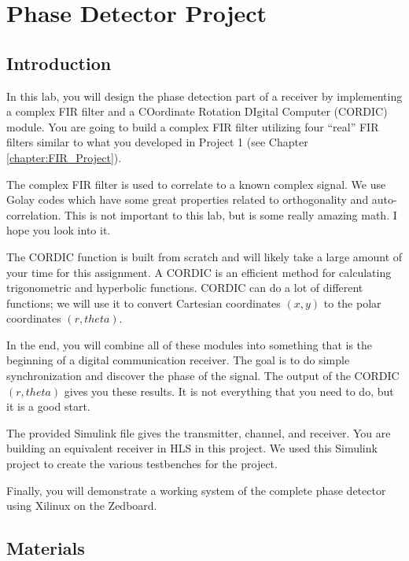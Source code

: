 \chapter{Phase Detector Project}
\glsresetall
\label{chapter:phase_detector}

\section{Introduction}

In this lab, you will design the phase detection part of a receiver by implementing a complex FIR filter and a COordinate Rotation DIgital Computer (CORDIC) module. You are going to build a complex FIR filter utilizing four ``real'' FIR filters similar to what you developed in Project 1 (see Chapter \ref{chapter:FIR_Project}).  

The complex FIR filter is used to correlate to a known complex signal.  We use Golay codes which have some great properties related to orthogonality and auto-correlation. This is not important to this lab, but is some really amazing math. I hope you look into it.

The CORDIC function is built from scratch and will likely take a large amount of your time for this assignment. A CORDIC is an efficient method for calculating  trigonometric and hyperbolic functions. CORDIC can do a lot of different functions; we will use it to convert Cartesian coordinates $(x,  y)$ to the polar coordinates $(r, theta)$. 

In the end, you will combine all of these modules into something that is the beginning of a digital communication receiver. The goal is to do simple synchronization and discover the phase of the signal. The output of the CORDIC $(r, theta)$ gives you these results. It is not everything that you need to do, but it is a good start. 

The provided Simulink file gives the transmitter, channel, and receiver. You are building an equivalent receiver in HLS in this project. We used this Simulink project to create the various testbenches for the project.

Finally, you will demonstrate a working system of the complete phase detector using Xilinux on the Zedboard. 

\section{Materials}


